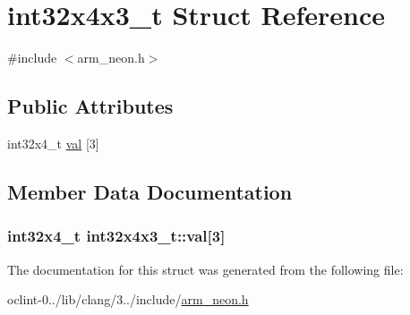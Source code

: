 \hypertarget{structint32x4x3__t}{\section{int32x4x3\-\_\-t Struct Reference}
\label{structint32x4x3__t}
}


{\ttfamily \#include $<$arm\-\_\-neon.\-h$>$}

\subsection*{Public Attributes}
\begin{DoxyCompactItemize}
\item 
int32x4\-\_\-t \hyperlink{structint32x4x3__t_a0daa889484f69e0a3fa05703ad17a9ed}{val} \mbox{[}3\mbox{]}
\end{DoxyCompactItemize}


\subsection{Member Data Documentation}
\hypertarget{structint32x4x3__t_a0daa889484f69e0a3fa05703ad17a9ed}{
\subsubsection[{val}]{\setlength{\rightskip}{0pt plus 5cm}int32x4\-\_\-t int32x4x3\-\_\-t\-::val\mbox{[}3\mbox{]}}}\label{structint32x4x3__t_a0daa889484f69e0a3fa05703ad17a9ed}


The documentation for this struct was generated from the following file\-:\begin{DoxyCompactItemize}
\item 
oclint-\/0../lib/clang/3../include/\hyperlink{arm__neon_8h}{arm\-\_\-neon.\-h}\end{DoxyCompactItemize}
